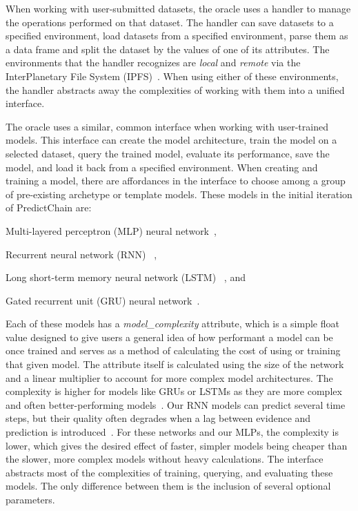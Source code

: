 \documentclass{ledger}
\begin{document}
When working with user-submitted datasets, the oracle uses a handler to manage the operations performed on that dataset. The handler can save datasets to a specified environment, load datasets from a specified environment, parse them as a data frame and split the dataset by the values of one of its attributes. The environments that the handler recognizes are \textit{local} and \textit{remote} via the InterPlanetary File System (IPFS)~\cite{benet2014ipfs}. When using either of these environments, the handler abstracts away the complexities of working with them into a unified interface.

The oracle uses a similar, common interface when working with user-trained models. This interface can create the model architecture, train the model on a selected dataset, query the trained model, evaluate its performance, save the model, and load it back from a specified environment. When creating and training a model, there are affordances in the interface to choose among a group of pre-existing archetype or template models. These models in the initial iteration of PredictChain are:
\begin{enumerate*}
    \item Multi-layered perceptron (MLP) neural network~\cite{preceptrons},
    \item Recurrent neural network (RNN) ~\cite{RNN},
    \item Long short-term memory neural network (LSTM) ~\cite{LSTM}, and
    \item Gated recurrent unit (GRU) neural network~\cite{GRU}.
\end{enumerate*}

Each of these models has a \textit{model\_complexity} attribute, which is a simple float value designed to give users a general idea of how performant a model can be once trained and serves as a method of calculating the cost of using or training that given model. The attribute itself is calculated using the size of the network and a linear multiplier to account for more complex model architectures. The complexity is higher for models like GRUs or LSTMs as they are more complex and often better-performing models~\cite{recurrentModeling}. Our RNN models can predict several time steps, but their quality often degrades when a lag between evidence and prediction is introduced~\cite{weightGuessing}. For these networks and our MLPs, the complexity is lower, which gives the desired effect of faster, simpler models being cheaper than the slower, more complex models without heavy calculations. The interface abstracts most of the complexities of training, querying, and evaluating these models. The only difference between them is the inclusion of several optional parameters.
\end{document}
